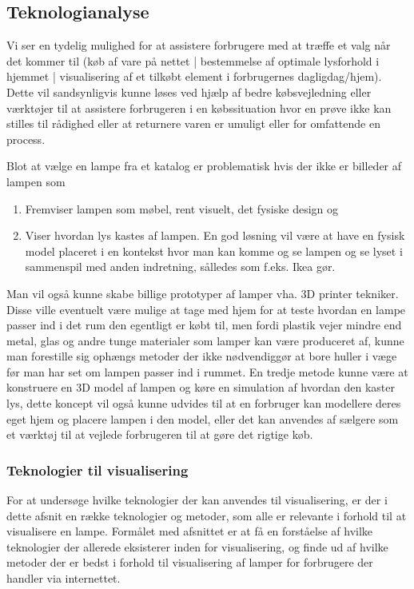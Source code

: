 \subsection{Teknologianalyse}
\label{sec:teknologianalyse}
Vi ser en tydelig mulighed for at assistere forbrugere med at træffe et valg når det kommer til (køb af vare på nettet | bestemmelse af optimale lysforhold i hjemmet | visualisering af et tilkøbt element i forbrugernes dagligdag/hjem). Dette vil sandsynligvis kunne løses ved hjælp af bedre købsvejledning eller værktøjer til at assistere forbrugeren i en købssituation hvor en prøve ikke kan stilles til rådighed eller at returnere varen er umuligt eller for omfattende en process.

Blot at vælge en lampe fra et katalog er problematisk hvis der ikke er billeder af lampen som 
\begin{enumerate}
    \item Fremviser lampen som møbel, rent visuelt, det fysiske design og 
    \item Viser hvordan lys kastes af lampen. En god løsning vil være at have en fysisk model placeret i en kontekst hvor man kan komme og se lampen og se lyset i sammenspil med anden indretning, sålledes som f.eks. Ikea gør.
\end{enumerate}

Man vil også kunne skabe billige prototyper af lamper vha. 3D printer tekniker. Disse ville eventuelt være mulige at tage med hjem for at teste hvordan en lampe passer ind i det rum den egentligt er købt til, men fordi plastik vejer mindre end metal, glas og andre tunge materialer som lamper kan være produceret af, kunne man forestille sig ophængs metoder der ikke nødvendiggør at bore huller i væge før man har set om lampen passer ind i rummet.
\newline En tredje metode kunne være at konstruere en 3D model af lampen og køre en simulation af hvordan den kaster lys, dette koncept vil også kunne udvides til at en forbruger kan modellere deres eget hjem og placere lampen i den model, eller det kan anvendes af sælgere som et værktøj til at vejlede forbrugeren til at gøre det rigtige køb.


\subsubsection{Teknologier til visualisering}
For at undersøge hvilke teknologier der kan anvendes til visualisering, er der i dette afsnit en række teknologier og metoder, som alle er relevante i forhold til at visualisere en lampe. Formålet med afsnittet er at få en forståelse af hvilke teknologier der allerede eksisterer inden for visualisering, og finde ud af hvilke metoder der er bedst i forhold til visualisering af lamper for forbrugere der handler via internettet.

